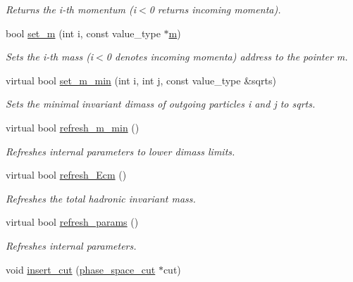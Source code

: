 \begin{DoxyCompactItemize}
\begin{DoxyCompactList}\small\item\em Returns the i-\/th momentum (i$<$0 returns incoming momenta). \end{DoxyCompactList}\item 
bool \hyperlink{a00450_a35eff1ece24702ed67b4fbc30e703283}{set\+\_\+m} (int i, const value\+\_\+type $\ast$\hyperlink{a00451_a3a9390d5b0f36b7778161963c43843b0}{m})
\begin{DoxyCompactList}\small\item\em Sets the i-\/th mass (i$<$0 denotes incoming momenta) address to the pointer m. \end{DoxyCompactList}\item 
virtual bool \hyperlink{a00450_af0547a26ceb1704830b86164e6d69f0e}{set\+\_\+m\+\_\+min} (int i, int j, const value\+\_\+type \&sqrts)
\begin{DoxyCompactList}\small\item\em Sets the minimal invariant dimass of outgoing particles i and j to sqrts. \end{DoxyCompactList}\item 
\hypertarget{a00450_a141207a1e9163c12d8b75caa57e0a46d}{}virtual bool \hyperlink{a00450_a141207a1e9163c12d8b75caa57e0a46d}{refresh\+\_\+m\+\_\+min} ()\label{a00450_a141207a1e9163c12d8b75caa57e0a46d}

\begin{DoxyCompactList}\small\item\em Refreshes internal parameters to lower dimass limits. \end{DoxyCompactList}\item 
\hypertarget{a00450_aefde619f51ccda518fe32dbf7ee6c4ed}{}virtual bool \hyperlink{a00450_aefde619f51ccda518fe32dbf7ee6c4ed}{refresh\+\_\+\+Ecm} ()\label{a00450_aefde619f51ccda518fe32dbf7ee6c4ed}

\begin{DoxyCompactList}\small\item\em Refreshes the total hadronic invariant mass. \end{DoxyCompactList}\item 
\hypertarget{a00450_afd23d61edd4e4348d18d3e95ffd8863a}{}virtual bool \hyperlink{a00450_afd23d61edd4e4348d18d3e95ffd8863a}{refresh\+\_\+params} ()\label{a00450_afd23d61edd4e4348d18d3e95ffd8863a}

\begin{DoxyCompactList}\small\item\em Refreshes internal parameters. \end{DoxyCompactList}\item 
\hypertarget{a00450_ac77e2f7c267dff6a67e36334a15646e4}{}void \hyperlink{a00450_ac77e2f7c267dff6a67e36334a15646e4}{insert\+\_\+cut} (\hyperlink{a00419}{phase\+\_\+space\+\_\+cut} $\ast$cut)\label{a00450_ac77e2f7c267dff6a67e36334a15646e4}


\end{DoxyCompactItemize}
